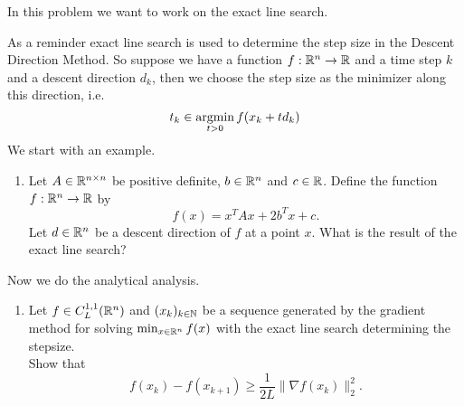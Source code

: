 \documentclass{ExerciseSheet}
\newif\ifsolutions
\begin{document}



\begin{problem}
In this problem we want to work on the exact line search. 

As a reminder exact line search is used to determine the step size in the Descent Direction Method.  
So suppose we have a function $f:\mathbb{R}^n \rightarrow \mathbb{R}$ and a time step $k$ and a descent direction $d_k$, then we choose the step size as the minimizer along this direction,  i.e.
\begin{equation*}
    t_k \in \operatorname*{argmin}_{t>0} f(x_k+td_k)
\end{equation*}
\renewcommand{\labelenumi}{\alph{enumi})}
We start with an example. 
\begin{enumerate}
    \item Let $A\in \mathbb{R}^{n\times n}$ be positive definite, $b\in \mathbb{R}^n$ and $c\in \mathbb{R}$. Define the function $f:\mathbb{R}^n \rightarrow \mathbb{R}$ by $$f(x)=x^TAx + 2b^Tx +c .$$ Let $d\in \mathbb{R}^n$ be a descent direction of $f$ at a point $x$. What is the result of the exact line search? 
\end{enumerate}
\noindent Now we do the analytical analysis.
\begin{enumerate}[resume]
    \item Let $f\in C^{1,1}_L(\mathbb{R}^n)$ and $(x_k)_{k\in \mathbb{N}}$ be a sequence generated by the gradient method for solving $\min_{x\in \mathbb{R}^n} f(x)$ with the exact line search determining the stepsize. \\
    Show that \begin{equation*}
        f(x_k) - f(x_{k+1}) \geq \frac{1}{2L} \|\nabla f(x_k)\|_2^2.
    \end{equation*}
\end{enumerate}
\end{problem}
\ifsolutions
\vskip 0.3cm
\end{document}
